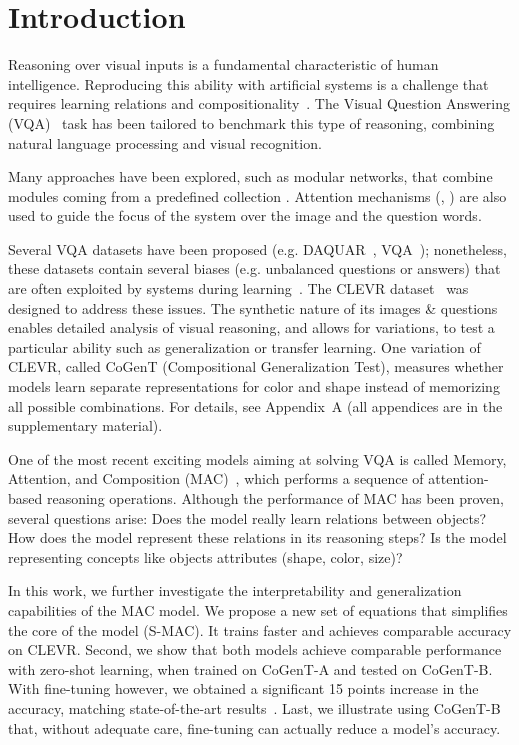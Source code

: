 \section{Introduction}
Reasoning over visual inputs is a fundamental characteristic of human intelligence.
Reproducing this ability with artificial systems is a challenge that requires learning relations and compositionality~\cite{hu2017learning, johnson2017inferring}. The Visual Question Answering (VQA)~\cite{antol2015vqa,malinowski2014towards,wu2017visual} task has been tailored to benchmark this type of reasoning, combining natural language processing and visual recognition.

Many approaches have been explored, such as modular networks, that combine modules coming from a predefined collection \cite{andreas2016learning,johnson2017inferring, mascharka2018transparency}. Attention mechanisms (\cite{bahdanau2014neural}, \cite{xu2015show}) are also used to guide the focus of the system over the image and the question words.

Several VQA datasets have been proposed (e.g. DAQUAR~\cite{malinowski2014multi}, VQA~\cite{antol2015vqa}); nonetheless, these datasets contain several biases (e.g. unbalanced questions or answers) that are often exploited by systems during learning~\cite{goyal2017making}.
The CLEVR dataset~\cite{johnson2017clevr} was designed to address these issues. The synthetic nature of its images \& questions enables detailed analysis of visual reasoning, and allows for variations, to test a particular ability such as generalization or transfer learning. One variation of CLEVR, called CoGenT (Compositional Generalization Test), measures whether models learn separate representations for color and shape instead of memorizing all possible combinations. 
For details, see Appendix~A (all appendices are in the supplementary material).


One of the most recent exciting models aiming at solving VQA is called Memory, Attention, and Composition (MAC)~\cite{hudson2018compositional}, which performs a sequence of attention-based reasoning operations. 
Although the performance of MAC has been proven, several questions arise:
Does the model really learn relations between objects? 
How does the model represent these relations in its reasoning steps? 
Is the model representing concepts like objects attributes (shape, color, size)?

In this work, we further investigate the interpretability and generalization capabilities of the MAC model.
We propose a new set of equations that simplifies the core of the model (S-MAC). It trains faster and achieves comparable accuracy on CLEVR. 
Second, we show that both models achieve comparable performance with zero-shot learning, when trained on CoGenT-A and tested on CoGenT-B. With fine-tuning however, we obtained a significant 15 points increase in the accuracy, matching state-of-the-art results~\cite{perez2017film, mascharka2018transparency}.
Last, we illustrate using CoGenT-B that, without adequate care, fine-tuning can actually reduce a model's accuracy.